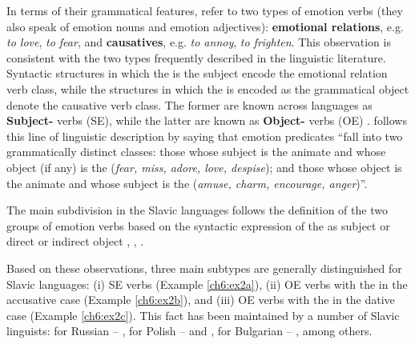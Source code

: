 \documentclass[output=paper,colorlinks,citecolor=brown]{langscibook}
\begin{document}
In terms of their grammatical features, \citet{johnson1989language} refer to two types of emotion verbs (they also speak of emotion nouns and emotion adjectives): \textbf{emotional relations}, e.g. \textit{to love}, \textit{to fear}, and \textbf{causatives}, e.g. \textit{to annoy}, \textit{to frighten}. This observation is consistent with the two types frequently described in the linguistic literature. Syntactic structures in which the  is the subject encode the emotional relation verb class, while the structures in which the  is encoded as the grammatical object denote the causative verb class. The former are known across languages as \textbf{Subject-} verbs (SE), while the latter are known as \textbf{Object-} verbs (OE) \citep{dowty1991thematic,levin2005argument}. \citet{Fellbaum1999a} follows this line of linguistic description by saying that emotion predicates ``fall into two grammatically distinct classes: those whose subject is the animate  and whose object (if any) is the  (\textit{fear, miss, adore, love, despise}); and those whose object is the animate  and whose subject is the  (\textit{amuse, charm, encourage, anger})''.

The main subdivision in the Slavic languages follows the definition of the two groups of emotion verbs based on the syntactic expression of the  as subject or direct or indirect object \citep [55]{Croft1993CaseMA}, \citep [21]{ovsjannikova2013encoding}, \citep [75]{tisheva2022syntactic}.

Based on these observations, three main subtypes are generally distinguished for Slavic languages: (i) SE verbs (Example \ref{ch6:ex2a}), (ii) OE verbs with the  in the accusative case (Example \ref{ch6:ex2b}), and (iii) OE verbs with the  in the dative case (Example \ref{ch6:ex2c}). This fact has been maintained by a number of Slavic linguists: for Russian – \citet{sonnenhauser2010event}, for Polish – \citet{bialy2005polish} and \citet{rozwadowska2007various}, for Bulgarian – \citet{slabakova1996bulgarian}, among others.
\end{document}
